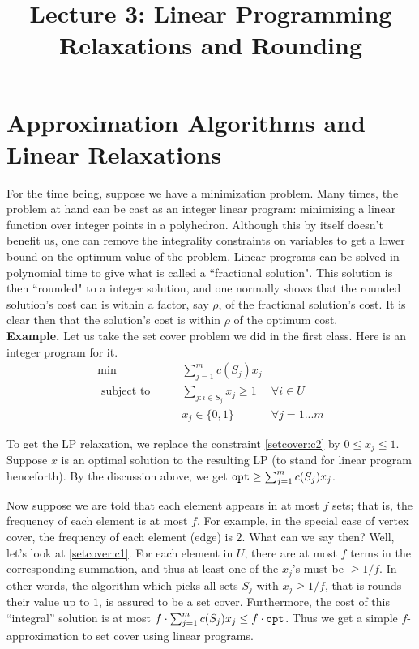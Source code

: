 \documentclass[11pt]{article}
\def\opt{{\tt opt}}
\begin{document}
\title{Lecture 3: Linear Programming Relaxations and Rounding}
\author{}
\date{}
\maketitle
\section{Approximation Algorithms and Linear Relaxations}
For the time being, suppose we have a minimization problem.
Many times, the problem at hand can be cast as an integer linear program: minimizing
a linear function over integer points in a polyhedron.
Although this by itself doesn't benefit us, one can remove the integrality constraints on 
variables to get a lower bound on the optimum value of the
problem. Linear programs can be solved in polynomial time to give what is called 
a ``fractional solution". This solution is then ``rounded" to a 
integer solution, and one normally shows that the rounded solution's cost 
can is within a factor, say $\rho$, of the fractional solution's cost. It is clear then
that the solution's cost is within $\rho$ of the optimum cost.   \\

\noindent
{\bf Example.} Let us take the set cover problem we did in the first class. 
Here is an integer program for it.
\begin{align}
\min 				& \qquad \sum_{j=1}^m c(S_j)x_j	& \label{lp:setcover} \\
\textrm{ subject to}	& \qquad \sum_{j: i\in S_j} x_j \ge 1	& \forall i \in U \label{setcover:c1} \\
				& \qquad x_j \in \{0,1\} 			& \forall j = 1 ... m \label{setcover:c2}	
\end{align} 

\noindent
To get the LP relaxation, we replace the constraint \eqref{setcover:c2} by $0\le x_j\le 1$.
Suppose $x$ is an optimal solution to the resulting LP (to stand for linear program henceforth).
By the discussion above, we get $\opt \ge \sum_{j=1}^m c(S_j)x_j$.

Now suppose we are told that each element appears in at most $f$ sets; that is, the frequency
of each element is at most $f$. For example, in the special case of vertex cover, the frequency
of each element (edge) is $2$. What can we say then?
Well, let's look at \eqref{setcover:c1}. For each element in $U$, there are at most $f$ terms in the corresponding summation, and thus at least one of the $x_j$'s must be $\ge 1/f$. In other words, the algorithm which picks all sets $S_j$ with $x_j\ge 1/f$, that is rounds their value up to $1$, is assured to be a set cover.
Furthermore, the cost of this ``integral'' solution is at most $f\cdot \sum_{j=1}^m c(S_j)x_j \le f\cdot\opt$. 
Thus we get a simple $f$-approximation to set cover using linear programs.
\end{document}

